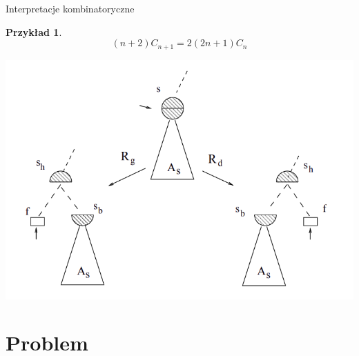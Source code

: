\documentclass[final]{beamer}
\theoremstyle{bluetheorem}
\theoremstyle{bluetheorem}
\theoremstyle{greentheorem}
\newtheorem{myexample}[mytheorem]{Przykład}
\begin{document}
\begin{frame}{Interpretacje kombinatoryczne}
    \begin{myexample}
        \[(n + 2) C_{n + 1} = 2 (2n + 1) C_{n}\]

        \begin{center}
            \includegraphics{catalan_interpretation.png}
        \end{center}
    \end{myexample}
\end{frame}

\section{Problem}
\end{document}

